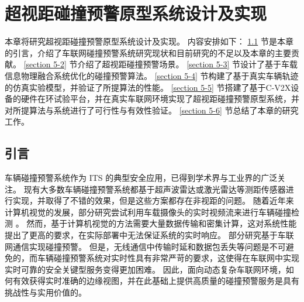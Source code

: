 \chapter[\hspace{0pt}超视距碰撞预警原型系统设计及实现]{{\hspace{-5pt}超视距碰撞预警原型系统设计及实现}}
\removelofgap
\removelotgap
本章将研究超视距碰撞预警原型系统设计及实现。
内容安排如下：
\ref{section 5-1} 节是本章的引言，介绍了车联网碰撞预警系统研究现状和目前研究的不足以及本章的主要贡献。
\ref{section 5-2} 节介绍了超视距碰撞预警场景。
\ref{section 5-3} 节设计了基于车载信息物理融合系统优化的碰撞预警算法。
\ref{section 5-4} 节构建了基于真实车辆轨迹的仿真实验模型，并验证了所提算法的性能。
\ref{section 5-5} 节搭建了基于C-V2X设备的硬件在环试验平台，并在真实车联网环境实现了超视距碰撞预警原型系统，并对所提算法与系统进行了可行性与有效性验证。
\ref{section 5-6} 节总结了本章的研究工作。

\section[\hspace{-2pt}引言]{{ \hspace{-8pt}引言}}\label{section 5-1}

车辆碰撞预警系统作为 ITS 的典型安全应用，已得到学术界与工业界的广泛关注。
现有大多数车辆碰撞预警系统都基于超声波雷达或激光雷达等测距传感器进行实现\cite{song2018real, wu2019series}，并取得了不错的效果，但是这些方案都存在非视距的问题。
随着近年来计算机视觉的发展，部分研究尝试利用车载摄像头的实时视频流来进行车辆碰撞检测 \cite{wang2016vision, song2018lane}。
然而，基于计算机视觉的方法需要大量数据传输和密集计算，这对系统性能提出了更高的要求，在实际部署中无法保证系统的实时响应。 
部分研究基于车联网通信实现碰撞预警\cite{hafner2013cooperative, gelbal2017elastic}。
但是，无线通信中传输时延和数据包丢失等问题是不可避免的，而车辆碰撞预警系统对实时性具有非常严苛的要求，这使得在车联网中实现实时可靠的安全关键型服务变得更加困难。
因此，面向动态复杂车联网环境，如何有效获得实时准确的边缘视图，并在此基础上提供高质量的碰撞预警服务是具有挑战性与实用价值的。

